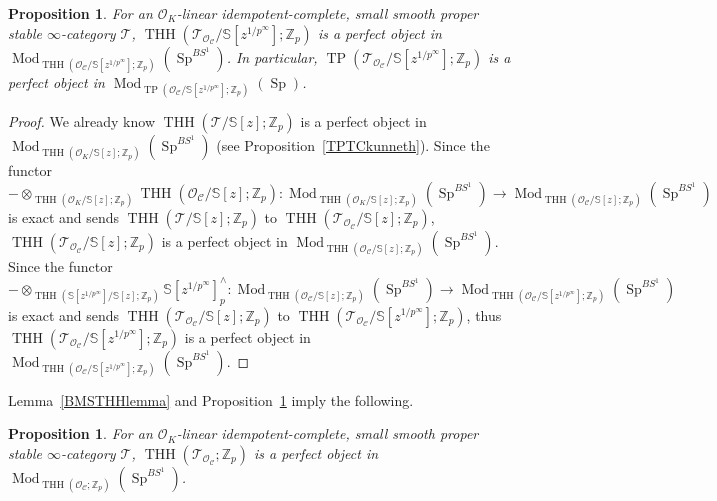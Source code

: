 \documentclass[11pt]{amsart}
\newcommand{\Z}{\mathbb{Z}}
\newcommand{\sO}{\mathcal{O}}
\newcommand{\sT}{\mathcal{T}}
\newcommand{\bS}{\mathbb{S}}
\newcommand{\Mod}{\operatorname{Mod}}
\newcommand{\THH}{\operatorname{THH}}
\newcommand{\TP}{\operatorname{TP}}
\newcommand{\Cu}{\mathcal{C}}
\newcommand{\Sp}{\operatorname{Sp}}
\newtheorem{prop}[lemma]{Proposition}
\theoremstyle{definition}
\theoremstyle{remark}
\numberwithin{equation}{section}
\begin{document}
\begin{prop}\label{THHOCperfect}
  For an $\sO_K$-linear idempotent-complete, small smooth proper stable $\infty$-category $\sT$, $\THH(\sT_{\sO_\Cu}/\bS[z^{1/p^{\infty}}];\Z_p)$ is a perfect object in $\Mod_{\THH({\sO_\Cu}/\bS[z^{1/p^{\infty}}];\Z_p)}(\Sp^{BS^1})$. In particular, $\TP(\sT_{\sO_\Cu}/\bS[z^{1/p^{\infty}}];\Z_p)$ is a perfect object in $\Mod_{\TP({\sO_\Cu}/\bS[z^{1/p^{\infty}}];\Z_p)}(\Sp)$.
\end{prop}
\begin{proof}
  We already know $\THH(\sT/\bS[z];\Z_p)$ is a perfect object in $\Mod_{\THH(\sO_K/\bS[z];\Z_p)}(\Sp^{BS^1})$ (see Proposition~\ref{TPTCkunneth}). Since the functor 
  \[
  -\otimes_{\THH(\sO_K/\bS[z];\Z_p)}\THH(\sO_{\Cu}/\bS[z];\Z_p) :\Mod_{\THH(\sO_K/\bS[z];\Z_p)}(\Sp^{BS^1}) \to \Mod_{\THH(\sO_{\Cu}/\bS[z];\Z_p)}(\Sp^{BS^1})
  \]
  is exact and sends $\THH(\sT/\bS[z];\Z_p)$ to $\THH(\sT_{\sO_\Cu}/\bS[z];\Z_p)$, $\THH(\sT_{\sO_\Cu}/\bS[z];\Z_p)$ is a perfect object in $\Mod_{\THH(\sO_{\Cu}/\bS[z];\Z_p)}(\Sp^{BS^1})$. Since the functor 
  \[
  -\otimes_{\THH(\bS[z^{1/p^{\infty}}]/\bS[z];\Z_p)}\bS[z^{1/p^{\infty}}]^{\wedge}_p :\Mod_{\THH(\sO_{\Cu}/\bS[z];\Z_p)}(\Sp^{BS^1}) \to \Mod_{\THH(\sO_{\Cu}/\bS[z^{1/p^\infty}];\Z_p)}(\Sp^{BS^1})
  \]
  is exact and sends $\THH(\sT_{\sO_\Cu}/\bS[z];\Z_p)$ to $\THH(\sT_{\sO_\Cu}/\bS[z^{1/p^{\infty}}];\Z_p)$, thus $\THH(\sT_{\sO_\Cu}/\bS[z^{1/p^{\infty}}];\Z_p)$ is a perfect object in $\Mod_{\THH(\sO_{\Cu}/\bS[z^{1/p^\infty}];\Z_p)}(\Sp^{BS^1})$.
\end{proof}

Lemma~\ref{BMSTHHlemma} and Proposition~\ref{THHOCperfect} imply the following.
\begin{prop}\label{THHOCbSperf}
  For an $\sO_K$-linear idempotent-complete, small smooth proper stable $\infty$-category $\sT$, $\THH(\sT_{\sO_\Cu};\Z_p)$ is a perfect object in $\Mod_{\THH({\sO_\Cu};\Z_p)}(\Sp^{BS^1})$.
\end{prop} 
\end{document}
